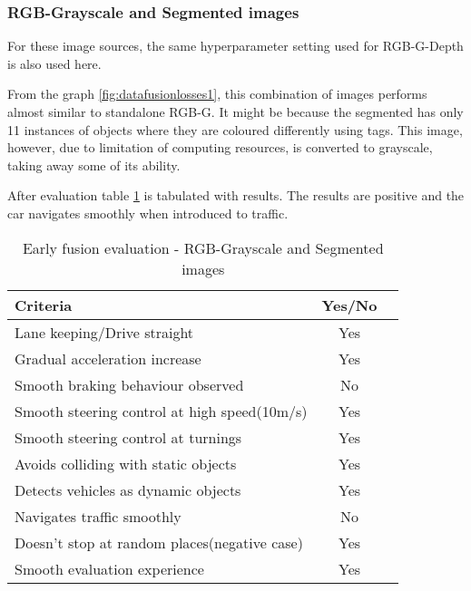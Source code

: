 \subsubsection*{RGB-Grayscale and Segmented images}
For these image sources, the same hyperparameter setting used for RGB-G-Depth is also used
here.

From the graph \ref{fig:datafusionlosses1}, this combination of images performs almost
similar to standalone RGB-G. It might be because the segmented has only 11 instances of
objects where they are coloured differently using tags. This image, however, due to
limitation of computing resources, is converted to grayscale, taking away some of its
ability.

After evaluation table \ref{table:earlyfusionrgbseg} is tabulated with results. The
results are positive and the car navigates smoothly when introduced to traffic.
\begin{table}[!ht]
    \centering
\begin{tabular}{lcc}
    \toprule
    Criteria  &  Yes/No  \\\midrule
    Lane keeping/Drive straight  & Yes  \\
    Gradual acceleration increase  & Yes\\
    Smooth braking behaviour observed & No \\
    Smooth steering control at high speed(10m/s) & Yes \\
    Smooth steering control at turnings & Yes\\
    Avoids colliding with static objects & Yes \\
    Detects vehicles as dynamic objects & Yes \\
    Navigates traffic smoothly & No\\
    Doesn't stop at random places(negative case) & Yes \\
    Smooth evaluation experience & Yes \\\bottomrule
\end{tabular}
\caption{Early fusion evaluation - RGB-Grayscale and Segmented images}
\label{table:earlyfusionrgbseg}
\end{table}

